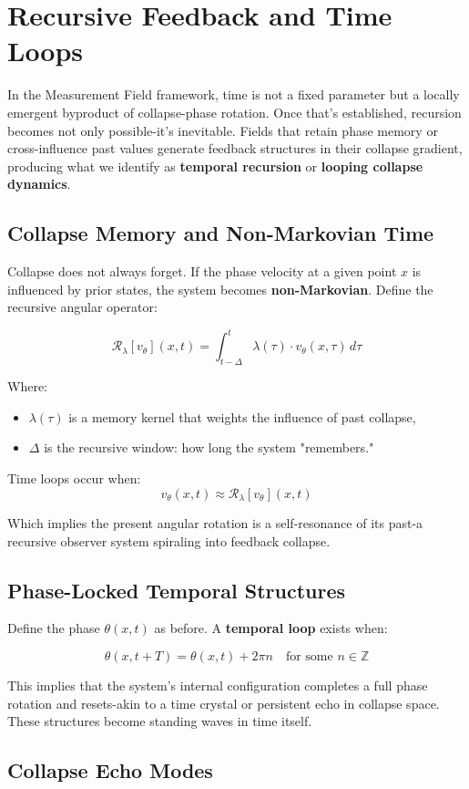 \section{Recursive Feedback and Time Loops}

In the Measurement Field framework, time is not a fixed parameter but a locally emergent byproduct of collapse-phase rotation. \cite{chapter_time} Once that’s established, recursion becomes not only possible-it’s inevitable. Fields that retain phase memory or cross-influence past values generate feedback structures in their collapse gradient, producing what we identify as \textbf{temporal recursion} or \textbf{looping collapse dynamics}. \cite{chapter_time} \subsection*{Collapse Memory and Non-Markovian Time}

Collapse does not always forget. \cite{chapter_time} If the phase velocity at a given point $x$ is influenced by prior states, the system becomes \textbf{non-Markovian}. Define the recursive angular operator:

\[
\mathcal{R}_\lambda[v_\theta](x,t) = \int_{t-\Delta}^{t} \lambda(\tau) \cdot v_\theta(x,\tau)\, d\tau
\]

Where:
\begin{itemize}
  \item $\lambda(\tau)$ is a memory kernel that weights the influence of past collapse,
  \item $\Delta$ is the recursive window: how long the system "remembers."
\end{itemize}

Time loops occur when:
\[
v_\theta(x,t) \approx \mathcal{R}_\lambda[v_\theta](x,t)
\]

Which implies the present angular rotation is a self-resonance of its past-a recursive observer system spiraling into feedback collapse. \cite{chapter_time} \subsection*{Phase-Locked Temporal Structures}

Define the phase $\theta(x,t)$ as before. A \textbf{temporal loop} exists when:

\[
\theta(x,t + T) = \theta(x,t) + 2\pi n \quad \text{for some } n \in \mathbb{Z}
\]

This implies that the system’s internal configuration completes a full phase rotation and resets-akin to a time crystal or persistent echo in collapse space. \cite{chapter_time} These structures become standing waves in time itself. \cite{chapter_time} \subsection*{Collapse Echo Modes}

